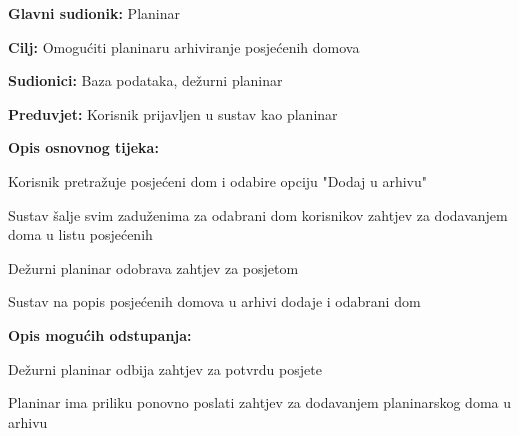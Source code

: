 	
			\noindent {}
		\begin{packed_item}
			
			\item \textbf{Glavni sudionik: }$ $Planinar$ $
			\item  \textbf{Cilj:} $ $Omogućiti planinaru arhiviranje posjećenih domova$ $
			\item  \textbf{Sudionici:} $ $Baza podataka, dežurni planinar$ $
			\item  \textbf{Preduvjet:} $ $Korisnik prijavljen u sustav kao planinar$ $
			\item  \textbf{Opis osnovnog tijeka:}
			
			\item[] \begin{packed_enum}
				
				\item $ $Korisnik pretražuje posjećeni dom i odabire opciju "Dodaj u arhivu" $ $
				\item $ $Sustav šalje svim  zaduženima za odabrani dom korisnikov zahtjev za dodavanjem doma u listu posjećenih$ $
				\item $ $Dežurni planinar odobrava zahtjev za posjetom$ $	
				\item $ $Sustav na popis posjećenih domova u arhivi dodaje i odabrani dom$ $
			\end{packed_enum}
			\item  \textbf{Opis mogućih odstupanja:}
			
			\item[] \begin{packed_item}
				
				\item[1.a] $ $Dežurni planinar odbija zahtjev za potvrdu posjete$ $
				\item[] \begin{packed_enum}
					\item $ $Planinar ima priliku ponovno poslati zahtjev za dodavanjem planinarskog doma u arhivu$ $
				\end{packed_enum}
			\end{packed_item}
		\end{packed_item}
	

